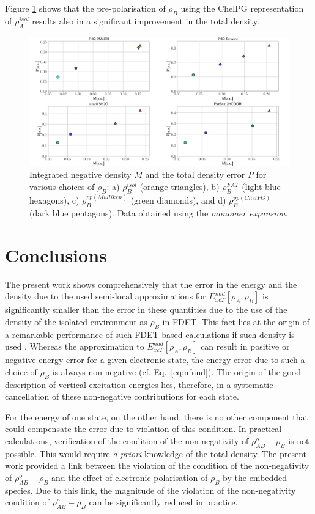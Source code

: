 \documentclass[amsmath,amssymb,preprint,aip,jcp]{revtex4-1}
\begin{document}
Figure \ref{fig:M_vs_P} shows that the pre-polarisation of $\rho_B$ using the ChelPG representation of $\rho_A^{isol}$
results also in a significant improvement in the total density.
\begin{figure}
\centering
\includegraphics[width=1.0\linewidth]{M_vs_P.pdf}
\caption{Integrated negative density $M$ and the total density error $P$ for various choices of $\rho_B$: a) $\rho_B^{isol}$ (orange triangles), b) $\rho_B^{FAT}$ (light blue hexagons), c) $\rho_B^{pp(Mulliken)}$ (green diamonds), and d) $\rho_B^{pp(ChelPG)}$ (dark blue pentagons). Data obtained using the {\it monomer expansion}.}
\label{fig:M_vs_P}
\end{figure}
\section{Conclusions}
The present work shows comprehensively that the error in the energy and the density due to the used semi-local approximations for 
${E}_{xcT}^{nad}[\rho_A,\rho_B]$ is significantly smaller than the error in these quantities due to the use of the density of the isolated environment as $\rho_B$ in FDET.
This fact lies at the origin of a remarkable performance of such FDET-based calculations if such density is used \cite{Ricardi2018}.
Whereas the approximation to ${E}_{xcT}^{nad}[\rho_A,\rho_B]$ can result in positive or negative energy error for a given electronic state, the energy error due to such a choice of $\rho_B$ is always non-negative (cf. Eq.~\ref{eq:nfund}). The origin of the good description of vertical excitation energies lies, therefore, in a systematic cancellation of these non-negative contributions for each state.

For the energy of one state, on the other hand, there is no other component that could compensate the error due to violation of this condition. In practical calculations, verification of the condition of the non-negativity of $\rho^{o}_{AB}-\rho_B$ is not possible. This would require \textit{a priori} knowledge of the total density.
The present work provided a link between the violation of the condition of the non-negativity of $\rho^{o}_{AB}-\rho_B$
and the effect of electronic polarisation of $\rho_B$ by the embedded species. Due to this link, the magnitude
of the violation of the non-negativity condition of $\rho^{o}_{AB}-\rho_B$ can be significantly reduced in practice.
\end{document}
